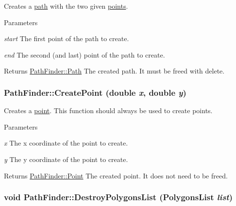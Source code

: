 Creates a \hyperlink{classPathFinder_a269aba09b7b3208092f67f2bc02cf63e}{path} with the two given \hyperlink{structPathFinder_1_1Point}{points}. 


\begin{DoxyParams}{Parameters}
\item[{\em start}]The first point of the path to create. \item[{\em end}]The second (and last) point of the path to create. \end{DoxyParams}
\begin{DoxyReturn}{Returns}
\hyperlink{classPathFinder_a269aba09b7b3208092f67f2bc02cf63e}{PathFinder::Path} The created path. It must be freed with delete. 
\end{DoxyReturn}
\hypertarget{classPathFinder_a457592f3579bbe0c0527360c2c8a928a}{
\subsubsection[{CreatePoint}]{ PathFinder::CreatePoint (double {\em x}, \/  double {\em y})}}
\label{classPathFinder_a457592f3579bbe0c0527360c2c8a928a}


Creates a \hyperlink{structPathFinder_1_1Point}{point}. This function should always be used to create points. 


\begin{DoxyParams}{Parameters}
\item[{\em x}]The x coordinate of the point to create. \item[{\em y}]The y coordinate of the point to create. \end{DoxyParams}
\begin{DoxyReturn}{Returns}
\hyperlink{structPathFinder_1_1Point}{PathFinder::Point} The created point. It does not need to be freed. 
\end{DoxyReturn}
\hypertarget{classPathFinder_a3306e3d1bb0ae88e236eb7cabbfce835}{
\subsubsection[{DestroyPolygonsList}]{\setlength{\rightskip}{0pt plus 5cm}void PathFinder::DestroyPolygonsList ({\bf PolygonsList} {\em list})}}
\label{classPathFinder_a3306e3d1bb0ae88e236eb7cabbfce835}


